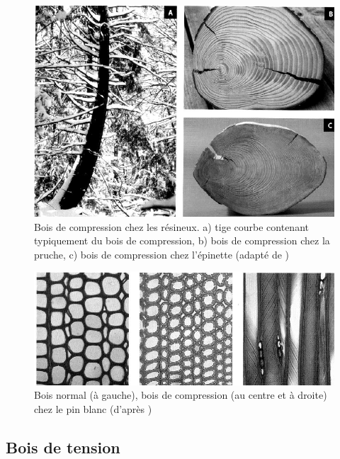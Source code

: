\begin{figure}[h]
	\centering
	\includegraphics[scale=0.55]{img/ch9_compression}
	\caption{Bois de compression chez les résineux. a) tige courbe contenant typiquement du bois de compression, b) bois de compression chez la pruche, c) bois de compression chez l'épinette (adapté de \cite{hoadley1990identifying})}
	\label{fig:compression}
\end{figure}

\begin{figure}[h]
	\centering
	\includegraphics[scale=0.7]{img/ch9_compression_micro}
	\caption{Bois normal (à gauche), bois de compression (au centre et à droite) chez le pin blanc (d'après \cite{hoadley1990identifying})}
	\label{fig:compression_micro}
\end{figure}

\subsection{Bois de tension}


